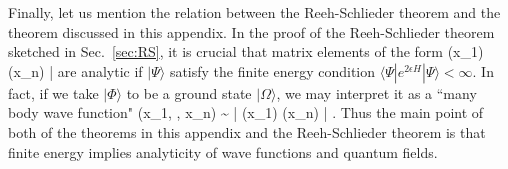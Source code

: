 \documentclass[a4paper,11pt]{article}
\theoremstyle{plain}
\theoremstyle{definition}
\numberwithin{thm}{section}
\newcommand{\bra}[1]{ \langle {#1} | }
\newcommand{\ket}[1]{ | {#1} \rangle }
\def\beq#1\eeq{\begin{align}#1\end{align}}
\begin{document}
Finally, let us mention the relation between the Reeh-Schlieder theorem and the theorem discussed in this appendix.
In the proof of the Reeh-Schlieder theorem sketched in Sec.~\ref{sec:RS}, it is crucial that matrix elements of the form
\beq
\bra{\Phi} \phi(x_1) \cdots \phi(x_n) \ket{\Psi}
\eeq
are analytic if $\ket{\Psi}$ satisfy the finite energy condition $\bra{\Psi} e^{2\epsilon H} \ket{\Psi} < \infty$. 
In fact, if we take $\ket{\Phi}$ to be a ground state $\ket{\Omega}$, we may interpret it as a ``many body wave function"
\beq
\psi(x_1, \cdots, x_n) \sim \bra{ \Omega } \phi(x_1) \cdots \phi(x_n) \ket{\Psi}.
\eeq
Thus the main point of both of the theorems in this appendix and the Reeh-Schlieder theorem is that 
finite energy implies analyticity of wave functions and quantum fields.









\end{document}
